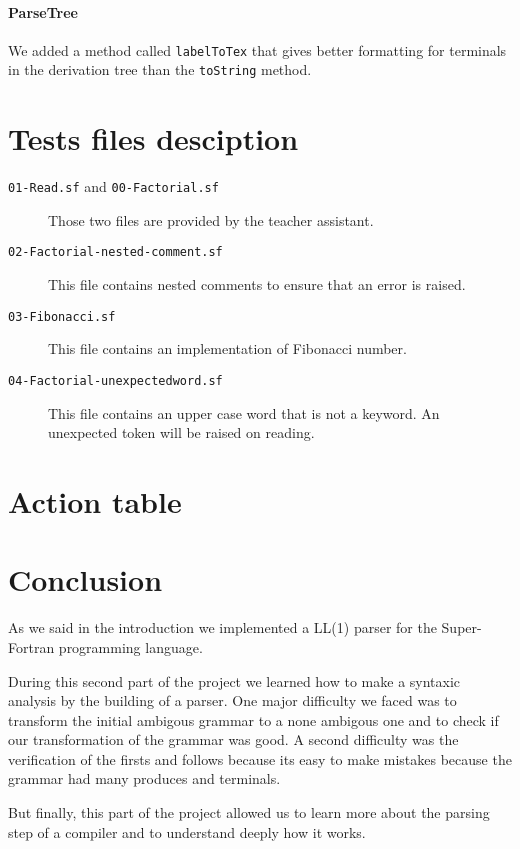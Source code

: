 \documentclass[12pt]{article}
\begin{document}
\paragraph{ParseTree}
We added a method called \texttt{labelToTex} that gives better formatting for terminals in the 
derivation tree than the \texttt{toString} method.


\section{Tests files desciption}

\begin{description}
    \item[\texttt{01-Read.sf} and \texttt{00-Factorial.sf}] Those two files are provided by the teacher assistant.   
    \item[\texttt{02-Factorial-nested-comment.sf}] This file contains nested comments to ensure that an error is raised.
    \item[\texttt{03-Fibonacci.sf}] This file contains an implementation of Fibonacci number.
    \item[\texttt{04-Factorial-unexpectedword.sf}] This file contains an upper case word that is not a keyword. An unexpected token will be raised on reading.
\end{description}

\section{Action table}


\section{Conclusion}

As we said in the introduction we implemented a LL(1) parser for the Super-Fortran programming language.

During this second part of the project we learned how to make a syntaxic analysis by
the building of a parser.
One major difficulty we faced was to transform the initial ambigous grammar to a none ambigous one
and to check if our transformation of the grammar was good.
A second difficulty was the verification of the firsts and follows because its easy to make mistakes
because the grammar had many produces and terminals.

But finally, this part of the project allowed us to learn more about the parsing step of a compiler 
and to understand deeply how it works.
\end{document}
